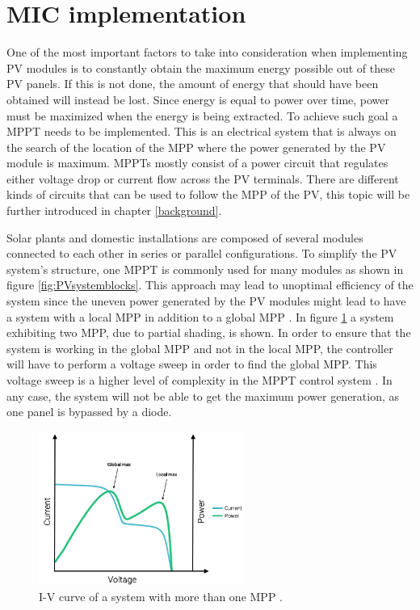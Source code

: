 
\section{MIC implementation}
One of the most important factors to take into consideration when implementing PV modules is to constantly obtain the maximum energy possible out of these PV panels. If this is not done, the amount of energy that should have been obtained will instead be lost. Since energy is equal to power over time, power must be maximized when the energy is being extracted. To achieve such goal a MPPT needs to be implemented. This is an electrical system that is always on the search of the location of the MPP where the power generated by the PV module is maximum. MPPTs mostly consist of a power circuit that regulates either voltage drop or current flow across the PV terminals. There are different kinds of circuits that can be used to follow the MPP of the PV, this topic will be further introduced in chapter \ref{background}.

Solar plants and domestic installations are composed of several modules connected to each other in series or parallel configurations. To simplify the PV system's structure, one MPPT is commonly used for many modules as shown in figure \ref{fig:PVsystemblocks}. This approach may lead to unoptimal efficiency of the system since the uneven power generated by the PV modules might lead to have a system with a local MPP in addition to a global MPP \cite{AN1521_MC}. In figure \ref{multiple_local_MPP} a system exhibiting two MPP, due to partial shading, is shown. In order to ensure that the system is working in the global MPP and not in the local MPP, the controller will have to perform a voltage sweep in order to find the global MPP. This voltage sweep is a higher level of complexity in the MPPT control system \cite{AN1521_MC}. In any case, the system will not be able to get the maximum power generation, as one panel is bypassed by a diode.

\begin{figure}[htbp]
	\begin{center}
		\includegraphics[width=0.6\textwidth]{../Pictures/local_MPP}
		\caption{I-V curve of a system with more than one MPP \cite{local_mpp}.}
		\label{multiple_local_MPP}
	\end{center}	
\end{figure}

